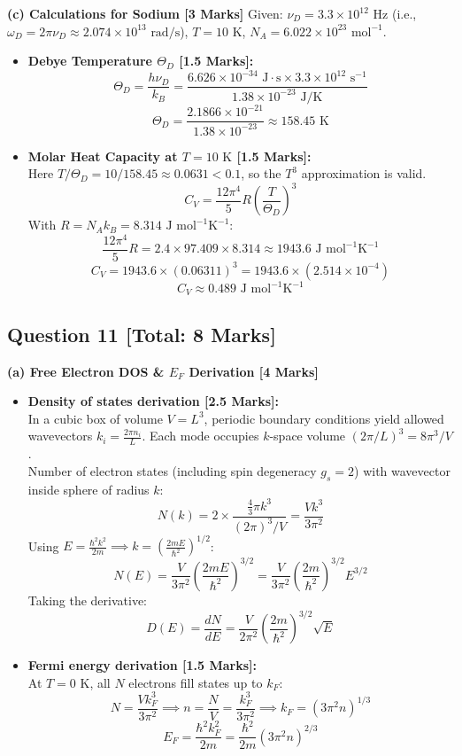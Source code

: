\documentclass[10pt,a4paper,twocolumn]{article}
\begin{document}
\textbf{(c) Calculations for Sodium [3 Marks]}
Given: $\nu_D = 3.3 \times 10^{12}\text{ Hz}$ (i.e., $\omega_D = 2\pi\nu_D \approx 2.074\times10^{13}\text{ rad/s}$), $T = 10\text{ K}$, $N_A = 6.022 \times 10^{23}\text{ mol}^{-1}$.
\begin{itemize}
    \item \textbf{Debye Temperature $\Theta_D$ [1.5 Marks]:}
    $$\Theta_D = \frac{h \nu_D}{k_B} = \frac{6.626 \times 10^{-34}\text{ J}\cdot\text{s} \times 3.3 \times 10^{12}\text{ s}^{-1}}{1.38 \times 10^{-23}\text{ J/K}}$$
    $$\Theta_D = \frac{2.1866 \times 10^{-21}}{1.38 \times 10^{-23}} \approx 158.45\text{ K}$$
    \item \textbf{Molar Heat Capacity at $T = 10\text{ K}$ [1.5 Marks]:}\\
    Here $T/\Theta_D = 10 / 158.45 \approx 0.0631 < 0.1$, so the $T^3$ approximation is valid.
    $$C_V = \frac{12\pi^4}{5} R \left(\frac{T}{\Theta_D}\right)^3$$
    With $R = N_A k_B = 8.314\text{ J mol}^{-1}\text{K}^{-1}$:
    $$\frac{12\pi^4}{5} R = 2.4 \times 97.409 \times 8.314 \approx 1943.6\text{ J mol}^{-1}\text{K}^{-1}$$
    $$C_V = 1943.6 \times (0.06311)^3 = 1943.6 \times (2.514 \times 10^{-4})$$
    $$C_V \approx 0.489\text{ J mol}^{-1}\text{K}^{-1}$$
\end{itemize}

\subsection*{Question 11 [Total: 8 Marks]}
\textbf{(a) Free Electron DOS \& $E_F$ Derivation [4 Marks]}
\begin{itemize}
    \item \textbf{Density of states derivation [2.5 Marks]:}\\
    In a cubic box of volume $V = L^3$, periodic boundary conditions yield allowed wavevectors $k_i = \frac{2\pi n_i}{L}$. Each mode occupies $k$-space volume $(2\pi/L)^3 = 8\pi^3/V$.\\
    Number of electron states (including spin degeneracy $g_s = 2$) with wavevector inside sphere of radius $k$:
    $$N(k) = 2 \times \frac{\frac{4}{3}\pi k^3}{(2\pi)^3/V} = \frac{V k^3}{3\pi^2}$$
    Using $E = \frac{\hbar^2 k^2}{2m} \implies k = \left(\frac{2mE}{\hbar^2}\right)^{1/2}$:
    $$N(E) = \frac{V}{3\pi^2}\left(\frac{2mE}{\hbar^2}\right)^{3/2} = \frac{V}{3\pi^2}\left(\frac{2m}{\hbar^2}\right)^{3/2} E^{3/2}$$
    Taking the derivative:
    $$D(E) = \frac{dN}{dE} = \frac{V}{2\pi^2}\left(\frac{2m}{\hbar^2}\right)^{3/2} \sqrt{E}$$
    \item \textbf{Fermi energy derivation [1.5 Marks]:}\\
    At $T = 0\text{ K}$, all $N$ electrons fill states up to $k_F$:
    $$N = \frac{V k_F^3}{3\pi^2} \implies n = \frac{N}{V} = \frac{k_F^3}{3\pi^2} \implies k_F = (3\pi^2 n)^{1/3}$$
    $$E_F = \frac{\hbar^2 k_F^2}{2m} = \frac{\hbar^2}{2m}(3\pi^2 n)^{2/3}$$
\end{itemize}
\end{document}

